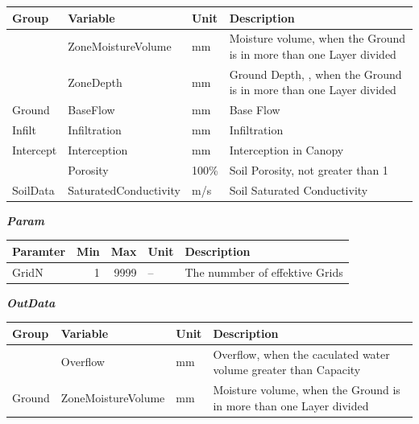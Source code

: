 \documentclass[
]{book}
\begin{document}
\begin{table}[!h]
\centering
\begin{tabular}{l|l|l|l}
\hline
Group & Variable & Unit & Description\\
\hline
 & ZoneMoistureVolume & mm & Moisture volume, when the Ground is in more than one Layer divided\\
\cline{2-4}
 & ZoneDepth & mm & Ground Depth, , when the Ground is in more than one Layer divided\\
\cline{2-4}
\multirow{-3}{*}{\raggedright\arraybackslash Ground} & BaseFlow & mm & Base Flow\\
\cline{1-4}
Infilt & Infiltration & mm & Infiltration\\
\cline{1-4}
Intercept & Interception & mm & Interception in Canopy\\
\cline{1-4}
 & Porosity & 100\% & Soil Porosity, not greater than 1\\
\cline{2-4}
\multirow{-2}{*}{\raggedright\arraybackslash SoilData} & SaturatedConductivity & m/s & Soil Saturated Conductivity\\
\hline
\end{tabular}
\end{table}

\textbf{\emph{Param}}

\begin{table}[!h]
\centering
\begin{tabular}{l|r|r|l|l}
\hline
Paramter & Min & Max & Unit & Description\\
\hline
GridN & 1 & 9999 & -- & The nummber of effektive Grids\\
\hline
\end{tabular}
\end{table}

\textbf{\emph{OutData}}

\begin{table}[!h]
\centering
\begin{tabular}{l|l|l|l}
\hline
Group & Variable & Unit & Description\\
\hline
 & Overflow & mm & Overflow, when the caculated water volume greater than Capacity\\
\cline{2-4}
\multirow{-2}{*}{\raggedright\arraybackslash Ground} & ZoneMoistureVolume & mm & Moisture volume, when the Ground is in more than one Layer divided\\
\hline
\end{tabular}
\end{table}
\end{document}
